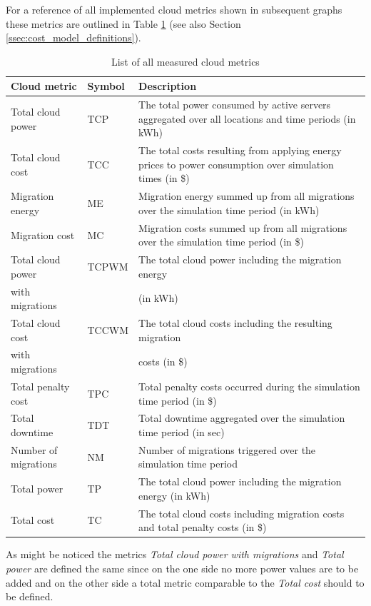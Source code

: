 For a reference of all implemented cloud metrics shown in subsequent graphs these metrics are outlined in Table \ref{tab:list_of_cloud_metrics} (see also Section \ref{ssec:cost_model_definitions}). 


\begin{table}[htbp]
\centering
\begin{tabularx}{\textwidth}{llX}
\toprule
  Cloud metric & Symbol & Description \\
\midrule
	Total cloud power & TCP & The total power consumed by active servers aggregated over all locations and time periods (in kWh)  \\
	Total cloud cost & TCC & The total costs resulting from applying energy prices to power consumption over simulation times (in \$) \\
	Migration energy & ME & Migration energy summed up from all migrations over the simulation time period (in kWh) \\
	Migration cost & MC & Migration costs summed up from all migrations over the simulation time period (in \$) \\
	Total cloud power & TCPWM & The total cloud power including the migration energy \\
	with migrations & & (in kWh) \\
	Total cloud cost & TCCWM & The total cloud costs including the resulting migration \\
	with migrations & & costs (in \$) \\
	Total penalty cost & TPC & Total penalty costs occurred during the simulation time period (in \$) \\
	Total downtime & TDT & Total downtime aggregated over the simulation time period (in sec) \\
	Number of migrations & NM & Number of migrations triggered over the simulation time period \\
	Total power & TP & The total cloud power including the migration energy (in kWh) \\
	Total cost & TC & The total cloud costs including migration costs and total penalty costs (in \$) \\
\bottomrule
\end{tabularx}
\caption{List of all measured cloud metrics}
\label{tab:list_of_cloud_metrics}
\end{table}

As might be noticed the metrics \textit{Total cloud power with migrations} and \textit{Total power} are defined the same since on the one side no more power values are to be added and on the other side a total metric comparable to the \textit{Total cost} should to be defined. 


